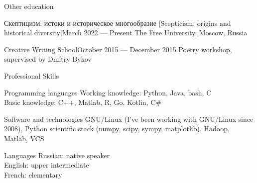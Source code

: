 \documentclass{resume}
\begin{document}
\begin{rSection}{Other education}
  \begin{rSubsection}{Скептицизм: истоки и историческое многообразие [Scepticism: origins and
      historical diversity]}{March 2022 --- Present}{} 
    The Free University, Moscow, Russia
  \end{rSubsection}
  
  \begin{rSubsection}{Creative Writing School}{October 2015 --- December 2015}{} 
    Poetry workshop, supervised by Dmitry Bykov
  \end{rSubsection}
\end{rSection}

\begin{rSection}{Professional Skills}
  \begin{rSubsection}{Programming languages}{}{}
    Working knowledge: Python, Java, bash, C \\
    Basic knowledge: C++, Matlab, R, Go, Kotlin, C\#
  \end{rSubsection}

  \begin{rSubsection}{Software and technologies}{}{}
    GNU/Linux (I've been working with GNU/Linux since 2008), Python scientific stack (numpy, scipy, sympy, matplotlib), Hadoop, Matlab, VCS
  \end{rSubsection}

  \begin{rSubsection}{Languages}{}{}
    Russian: native speaker \\
    English: upper intermediate \\
    French: elementary
  \end{rSubsection}
\end{rSection}
\end{document}
